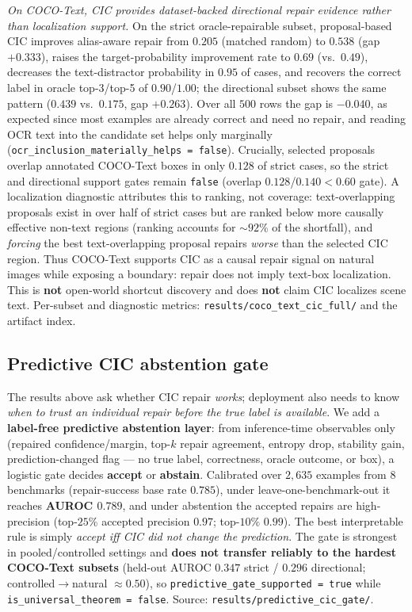 \documentclass[11pt]{article}
\begin{document}
\emph{On COCO-Text, CIC provides dataset-backed directional repair evidence rather
than localization support.} On the strict oracle-repairable subset, proposal-based
CIC improves alias-aware repair from $0.205$ (matched random) to $0.538$ (gap
$+0.333$), raises the target-probability improvement rate to $0.69$ (vs.\ $0.49$),
decreases the text-distractor probability in $0.95$ of cases, and recovers the correct
label in oracle top-3/top-5 of $0.90$/$1.00$; the directional subset shows the same
pattern ($0.439$ vs.\ $0.175$, gap $+0.263$). Over all $500$ rows the gap is $-0.040$,
as expected since most examples are already correct and need no repair, and reading OCR
text into the candidate set helps only marginally
(\texttt{ocr\_inclusion\_materially\_helps = false}). Crucially, selected proposals
overlap annotated COCO-Text boxes in only $0.128$ of strict cases, so the strict and
directional support gates remain \texttt{false} (overlap $0.128$/$0.140 < 0.60$ gate).
A localization diagnostic attributes this to ranking, not coverage: text-overlapping
proposals exist in over half of strict cases but are ranked below more causally
effective non-text regions (ranking accounts for ${\sim}92\%$ of the shortfall), and
\emph{forcing} the best text-overlapping proposal repairs \emph{worse} than the
selected CIC region. Thus COCO-Text supports CIC as a causal repair signal on natural
images while exposing a boundary: repair does not imply text-box localization. This is
\textbf{not} open-world shortcut discovery and does \textbf{not} claim CIC localizes
scene text. Per-subset and diagnostic metrics:
\texttt{results/coco\_text\_cic\_full/} and the artifact index.

\subsection{Predictive CIC abstention gate}\label{sec:predgate}
The results above ask whether CIC repair \emph{works}; deployment also needs to know
\emph{when to trust an individual repair before the true label is available}. We add a
\textbf{label-free predictive abstention layer}: from inference-time observables only
(repaired confidence/margin, top-$k$ repair agreement, entropy drop, stability gain,
prediction-changed flag --- no true label, correctness, oracle outcome, or box), a
logistic gate decides \textbf{accept} or \textbf{abstain}. Calibrated over $2{,}635$
examples from $8$ benchmarks (repair-success base rate $0.785$), under
leave-one-benchmark-out it reaches \textbf{AUROC $0.789$}, and under abstention the
accepted repairs are high-precision (top-$25\%$ accepted precision $0.97$; top-$10\%$
$0.99$). The best interpretable rule is simply \emph{accept iff CIC did not change the
prediction}. The gate is strongest in pooled/controlled settings and \textbf{does not
transfer reliably to the hardest COCO-Text subsets} (held-out AUROC $0.347$ strict /
$0.296$ directional; controlled$\to$natural $\approx0.50$), so
\texttt{predictive\_gate\_supported = true} while \texttt{is\_universal\_theorem =
false}. Source: \texttt{results/predictive\_cic\_gate/}.
\end{document}
